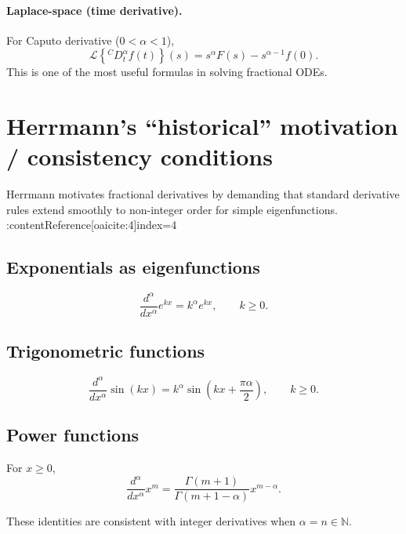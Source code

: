 \paragraph{Laplace-space (time derivative).}
For Caputo derivative ($0<\alpha<1$),
\begin{equation}
\boxed{
\mathcal{L}\left\{{}^{C}D_t^\alpha f(t)\right\}(s)
=
s^\alpha F(s) - s^{\alpha-1}f(0).
}
\end{equation}
This is one of the most useful formulas in solving fractional ODEs.


\section{Herrmann's ``historical'' motivation / consistency conditions}

Herrmann motivates fractional derivatives by demanding that standard derivative rules
extend smoothly to non-integer order for simple eigenfunctions. :contentReference[oaicite:4]{index=4}

\subsection{Exponentials as eigenfunctions}
\begin{equation}
\boxed{
\frac{d^\alpha}{dx^\alpha}e^{kx} = k^\alpha e^{kx},
\qquad k\ge 0.
}
\end{equation}

\subsection{Trigonometric functions}
\begin{equation}
\boxed{
\frac{d^\alpha}{dx^\alpha}\sin(kx)
=
k^\alpha\sin\!\left(kx+\frac{\pi\alpha}{2}\right),
\qquad k\ge 0.
}
\end{equation}

\subsection{Power functions}
For $x\ge 0$,
\begin{equation}
\boxed{
\frac{d^\alpha}{dx^\alpha}x^m
=
\frac{\Gamma(m+1)}{\Gamma(m+1-\alpha)}x^{m-\alpha}.
}
\end{equation}

These identities are consistent with integer derivatives when $\alpha=n\in\mathbb{N}$.

